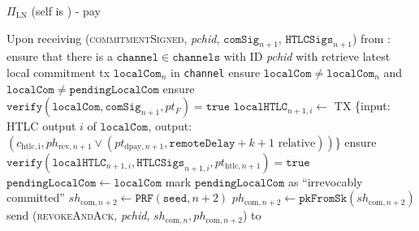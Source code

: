 \begin{protocolbox}{$\Pi_{\mathrm{LN}}$ (self is \alice) - pay}
\begin{algorithmic}[1]
    \State Upon receiving (\textsc{commitmentSigned}, \textit{pchid},
    $\mathtt{comSig}_{n+1}$, $\mathtt{HTLCSigs}_{n+1}$) from \bob:
    \Indent
      \State ensure that there is a $\mathtt{channel} \in \mathtt{channels}$
      with ID \textit{pchid} with \bob
      \State retrieve latest local commitment tx $\mathtt{localCom}_n$ in
      \texttt{channel}
      \State ensure $\mathtt{localCom} \neq \mathtt{localCom}_n$ and
      $\mathtt{localCom} \neq \mathtt{pendingLocalCom}$
      \State ensure $\mathtt{verify}\left(\mathtt{localCom},
      \mathtt{comSig}_{n+1}, pt_F\right) = \mathtt{true}$
        \State $\mathtt{localHTLC}_{n+1, i} \gets$ TX \{input: HTLC output $i$
        of $\mathtt{localCom}$, output: $\left(c_{\mathrm{htlc, i}},
        ph_{\mathrm{rev}, n+1} \vee \left(pt_{\mathrm{dpay}, n+1},
        \mathtt{remoteDelay} + k + 1 \text{ relative}\right)\right)$\}
        \State ensure $\mathtt{verify}\left(\mathtt{localHTLC}_{n+1, i},
        \mathtt{HTLCSigs}_{n+1, i}, pt_{\mathrm{htlc}, n+1}\right) =
        \mathtt{true}$
      \EndFor
      \State $\mathtt{pendingLocalCom} \gets \mathtt{localCom}$
      \State mark $\mathtt{pendingLocalCom}$ as ``irrevocably committed''
      \State $sh_{\mathrm{com}, n+2} \gets
      \texttt{PRF}\left(\mathtt{seed}, n+2\right)$
      \State $ph_{\mathrm{com}, n+2} \gets
      \mathtt{pkFromSk}\left(sh_{\mathrm{com}, n+2}\right)$
      \State send (\textsc{revokeAndAck}, \textit{pchid}, $sh_{\mathrm{com}, n},
      ph_{\mathrm{com}, n+2}$) to \bob
    \EndIndent
    \State


\end{algorithmic}
\end{protocolbox}

